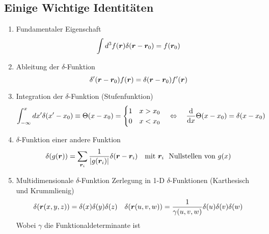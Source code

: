 \subsection{Einige Wichtige Identitäten}%
\begin{enumerate}
  \item Fundamentaler Eigenschaft
  \begin{equation*}
    \int d^3 f(\vb*r)\delta(\vb*r-\vb*r_0)=f(\vb*r_0)
  \end{equation*}

  \item Ableitung der $\delta$-Funktion
    \begin{equation*}
      \delta'(\vb*r-\vb*r_0)f(\vb*r) = \delta(\vb*r-\vb*r_0)f'(\vb*r)
    \end{equation*}

  \item Integration der $\delta$-Funktion (Stufenfunktion)
    \begin{equation*}
      \int_{-\infty}^xdx'\delta(x'-x_0) \equiv \Theta(x-x_0) =
      \begin{cases}
        1 & x > x_0 \\
        0 & x < x_0
      \end{cases}
      \quad \Leftrightarrow\quad \dv{x} \Theta(x-x_0) = \delta(x-x_0)
    \end{equation*}

  \item $\delta$-Funktion einer andere Funktion
    \begin{equation*}
      \delta(g(\vb*r)) = \sum_{\vb*r_i} \frac{1}{\abs{g(\vb*r_i)}}
      \delta(\vb*r-\vb*r_i) 
      \quad \text{mit}\ \vb*r_i\ \text{ Nullstellen von } g(x)
    \end{equation*}

  \item Multidimensionale $\delta$-Funktion Zerlegung in 1-D 
    $\delta$-Funktionen (Karthesisch und Krummlienig)
     \begin{equation*}
       \delta(\vb*r(x,y,z)) 
       = \delta(x)\delta(y)\delta(z) 
       \quad \delta(\vb*r(u,v,w)) 
       = \frac{1}{\gamma(u,v,w)}\delta(u)\delta(v)\delta(w) 
     \end{equation*}
     Wobei $\gamma$ die Funktionaldeterminante ist
\end{enumerate}
